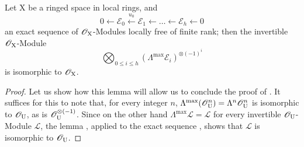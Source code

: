 \begin{lemma}[21.11.1.2]
\label{IV.21.11.1.2}
Let $\mathrm{X}$ be a ringed space in local rings, and
\[
  0\leftarrow\mathscr{E}_0\xleftarrow{u_0}\mathscr{E}_1\leftarrow\ldots\leftarrow\mathscr{E}_h\leftarrow 0
\]
an exact sequence of $\mathscr{O}_{\mathrm{X}}$-Modules locally free of finite rank; then the invertible $\mathscr{O}_{\mathrm{X}}$-Module
\[
  \bigotimes_{0\leq i\leq h}(\Lambda^{\max}\mathscr{E}_i)^{\otimes(-1)^i}
\]
is isomorphic to $\mathscr{O}_{\mathrm{X}}$.
\end{lemma}

\begin{proof}
Let us show how this lemma will allow us to conclude the proof of .
It suffices for this to note that, for every integer $n$, $\Lambda^{\max}(\mathscr{O}_{\mathrm{U}}^n)=\Lambda^n\mathscr{O}_{\mathrm{U}}^n$ is isomorphic to $\mathscr{O}_{\mathrm{U}}$, as is $\mathscr{O}_{\mathrm{U}}^{\otimes(-1)}$. Since on the other hand $\Lambda^{\max}\mathscr{L}=\mathscr{L}$ for every invertible $\mathscr{O}_{\mathrm{U}}$-Module $\mathscr{L}$, the lemma , applied to the exact sequence , shows that $\mathscr{L}$ is isomorphic to $\mathscr{O}_{\mathrm{U}}$.


\end{proof}
